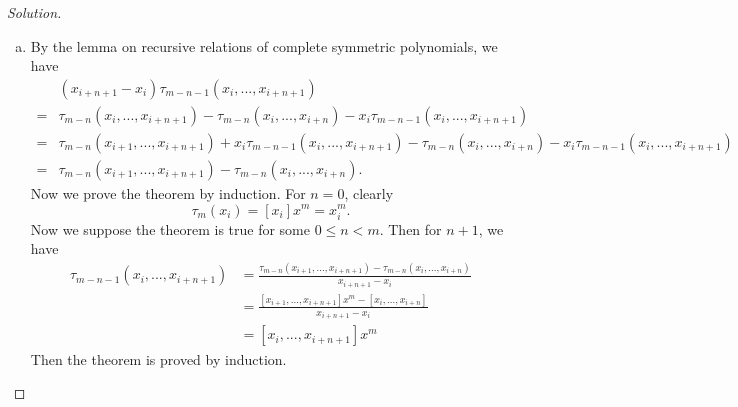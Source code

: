 \documentclass[a4paper]{ctexart}
\begin{document}
\begin{proof}[Solution]
\begin{enumerate}[(a)]
		\item By the lemma on recursive relations of complete symmetric polynomials, we have
		      \begin{align*}
			        & (x_{i+n+1}-x_i)\tau_{m-n-1}(x_i,...,x_{i+n+1})                                                                                      \\
			      = & \tau_{m-n}(x_i,...,x_{i+n+1})-\tau_{m-n}(x_i,...,x_{i+n})-x_i\tau_{m-n-1}(x_i,...,x_{i+n+1})                                        \\
			      = & \tau_{m-n}(x_{i+1},...,x_{i+n+1})+x_i\tau_{m-n-1}(x_i,...,x_{i+n+1})-\tau_{m-n}(x_i,...,x_{i+n})-x_i\tau_{m-n-1}(x_i,...,x_{i+n+1}) \\
			      = & \tau_{m-n}(x_{i+1},...,x_{i+n+1})-\tau_{m-n}(x_i,...,x_{i+n}).
		      \end{align*}
		      Now we prove the theorem by induction. For $n=0$, clearly
		      $$
			      \tau_m(x_i)=[x_i]x^m=x_i^m.
		      $$
		      Now we suppose the theorem is true for some $0\leq n<m$. Then for $n+1$, we have
		      \begin{align*}
			      \tau_{m-n-1}(x_i,...,x_{i+n+1}) & =\frac{\tau_{m-n}(x_{i+1},...,x_{i+n+1})-\tau_{m-n}(x_i,...,x_{i+n})}{x_{i+n+1}-x_{i}} \\
			                                      & =\frac{[x_{i+1},...,x_{i+n+1}]x^m-[x_i,...,x_{i+n}]}{x_{i+n+1}-x_{i}}                  \\
			                                      & =[x_i,...,x_{i+n+1}]x^m
		      \end{align*}
		      Then the theorem is proved by induction.
	\end{enumerate}
\end{proof}
\end{document}
